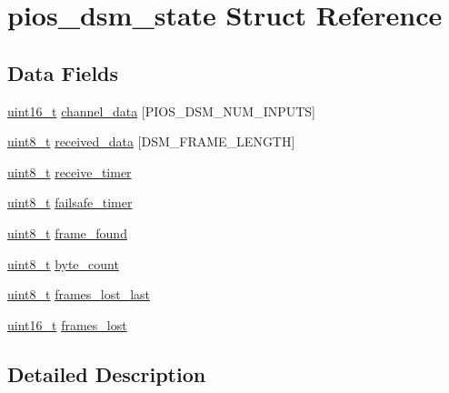 \hypertarget{structpios__dsm__state}{\section{pios\-\_\-dsm\-\_\-state Struct Reference}
\label{structpios__dsm__state}
}
\subsection*{Data Fields}
\begin{DoxyCompactItemize}
\item 
\hyperlink{stdint_8h_a273cf69d639a59973b6019625df33e30}{uint16\-\_\-t} \hyperlink{structpios__dsm__state_aade4ea4a4eb46a6e63db80e6f4c55b11}{channel\-\_\-data} \mbox{[}P\-I\-O\-S\-\_\-\-D\-S\-M\-\_\-\-N\-U\-M\-\_\-\-I\-N\-P\-U\-T\-S\mbox{]}
\item 
\hyperlink{stdint_8h_aba7bc1797add20fe3efdf37ced1182c5}{uint8\-\_\-t} \hyperlink{structpios__dsm__state_af4caef811fdc9b8381bedc715e92068e}{received\-\_\-data} \mbox{[}D\-S\-M\-\_\-\-F\-R\-A\-M\-E\-\_\-\-L\-E\-N\-G\-T\-H\mbox{]}
\item 
\hyperlink{stdint_8h_aba7bc1797add20fe3efdf37ced1182c5}{uint8\-\_\-t} \hyperlink{structpios__dsm__state_af7296b9f7aa4be7e56a8edd0025c5fab}{receive\-\_\-timer}
\item 
\hyperlink{stdint_8h_aba7bc1797add20fe3efdf37ced1182c5}{uint8\-\_\-t} \hyperlink{structpios__dsm__state_a70f387f5d5e82231a14003705b43fb59}{failsafe\-\_\-timer}
\item 
\hyperlink{stdint_8h_aba7bc1797add20fe3efdf37ced1182c5}{uint8\-\_\-t} \hyperlink{structpios__dsm__state_a6d1e951d9c03ec9651104491b4ad9b1a}{frame\-\_\-found}
\item 
\hyperlink{stdint_8h_aba7bc1797add20fe3efdf37ced1182c5}{uint8\-\_\-t} \hyperlink{structpios__dsm__state_ad73722b14672f205b7bfd9ebdac3b53a}{byte\-\_\-count}
\item 
\hyperlink{stdint_8h_aba7bc1797add20fe3efdf37ced1182c5}{uint8\-\_\-t} \hyperlink{structpios__dsm__state_a427f6b8b7743f180403285623f71260e}{frames\-\_\-lost\-\_\-last}
\item 
\hyperlink{stdint_8h_a273cf69d639a59973b6019625df33e30}{uint16\-\_\-t} \hyperlink{structpios__dsm__state_ae3dfacd2e0da0bc8b4503054f854bfcc}{frames\-\_\-lost}
\end{DoxyCompactItemize}


\subsection{Detailed Description}


